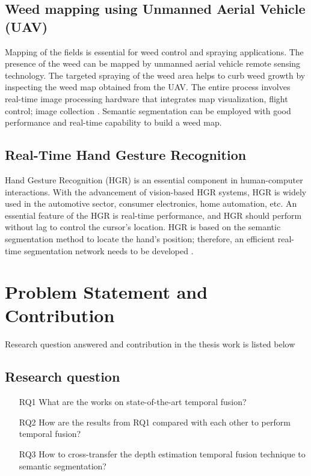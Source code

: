 	\subsection{Weed mapping using Unmanned Aerial Vehicle (UAV)}
	
	Mapping of the fields is essential for weed control and spraying applications. The presence of the weed can be mapped by unmanned aerial vehicle remote sensing technology. The targeted spraying of the weed area helps to curb weed growth by inspecting the weed map obtained from the UAV. The entire process involves real-time image processing hardware that integrates map visualization, flight control; image collection \cite{33_deng2020lightweight}. Semantic segmentation can be employed with good performance and real-time capability to build a weed map. 
	
	\subsection{Real-Time Hand Gesture Recognition}
	
	Hand Gesture Recognition (HGR) is an essential component in human-computer interactions. With the advancement of vision-based HGR systems, HGR is widely used in the automotive sector, consumer electronics, home automation, etc. An essential feature of the HGR is real-time performance, and HGR should perform without lag to control the cursor's location. HGR is based on the semantic segmentation method to locate the hand's position; therefore, an efficient real-time segmentation network needs to be developed \cite{34_hsieh2010real}.  
	
	\vspace{65mm} %
	
    \section{Problem Statement and Contribution}
    
    Research question answered and contribution in the thesis work is listed below
    \subsection{Research question}
    
     \begin{itemize}
    	\setlength\itemsep{0.01em}
    	\item[RQ1] What are the works on state-of-the-art temporal fusion?
    	\item[RQ2] How are the results from RQ1 compared with each other to perform temporal
    	fusion?
    	\item[RQ3] How to cross-transfer the depth estimation temporal fusion technique to semantic segmentation?
    \end{itemize}
    
